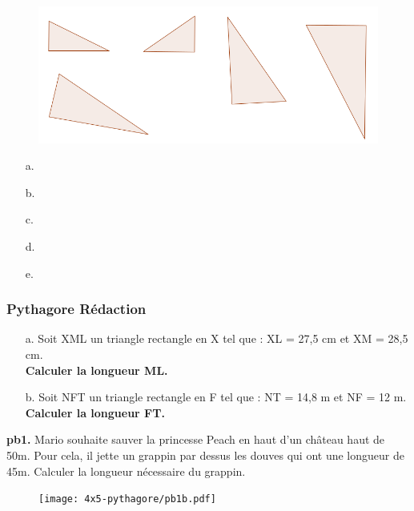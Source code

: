 \begin{figure}[H]
  \centering
  \includegraphics[width=0.6\linewidth]{4x5-pythagore/ex2.png}
\end{figure}

\begin{multicols}{5}
  \begin{enumerate}
  \item[a.] \dotfill \\ \Pointilles[1]
  \item[b.] \dotfill \\ \Pointilles[1]
  \item[c.] \dotfill \\ \Pointilles[1]
  \item[d.] \dotfill \\ \Pointilles[1]
  \item[e.] \dotfill \\ \Pointilles[1]
  \end{enumerate}
\end{multicols}

\subsubsection*{Pythagore Rédaction}

\begin{multicols}{2}
\begin{enumerate}
  \item[a.]Soit XML un triangle rectangle en X tel que : XL = 27,5 cm et XM = 28,5 cm. \\
  \textbf{Calculer la longueur ML.}

  \item[b.]Soit NFT un triangle rectangle en F tel que : NT = 14,8 m et NF = 12 m. \\
  \textbf{Calculer la longueur FT.}

\end{enumerate}
\end{multicols}

\Pointilles[13]

\begin{minipage}[t]{0.65\textwidth}
  \textbf{pb1.} Mario souhaite sauver la princesse Peach en haut d'un château haut de 50m. Pour cela, il jette un grappin par dessus les douves qui ont une longueur de 45m. Calculer la longueur nécessaire du grappin.
  
  \Pointilles[5]
  \end{minipage}
  \begin{minipage}[t]{0.35\textwidth}
  \begin{figure}[H]
    \centering
    \texttt{[image: 4x5-pythagore/pb1b.pdf]}
  \end{figure}
\end{minipage}

